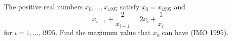 The positive real numbers $x_0, \ldots, x_{1995}$ satisfy $x_0 = x_{1995}$ and
\[ x_{i-1} + \frac{2}{x_{i-1}} = 2x_i + \frac{1}{x_i} \]
for $i = 1, \ldots, 1995$. Find the maximum value that $x_0$ can have (IMO 1995).
